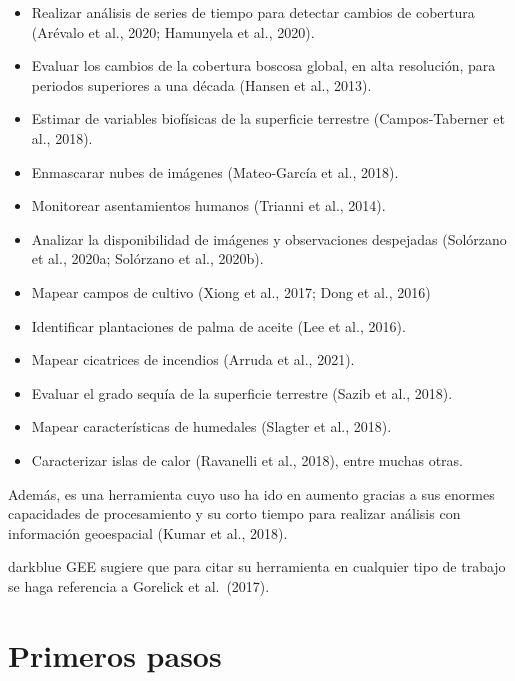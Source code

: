 \documentclass[
  12pt,
  letterpaper,
  twoside]{book}
\providecommand{\tightlist}{%
  \setlength{\itemsep}{0pt}\setlength{\parskip}{0pt}}
\begin{document}
\begin{itemize}
\tightlist
\item
  Realizar análisis de series de tiempo para detectar cambios de cobertura (Arévalo et al., 2020; Hamunyela et al., 2020).
\item
  Evaluar los cambios de la cobertura boscosa global, en alta resolución, para periodos superiores a una década (Hansen et al., 2013).
\item
  Estimar de variables biofísicas de la superficie terrestre (Campos-Taberner et al., 2018).
\item
  Enmascarar nubes de imágenes (Mateo-García et al., 2018).
\item
  Monitorear asentamientos humanos (Trianni et al., 2014).
\item
  Analizar la disponibilidad de imágenes y observaciones despejadas (Solórzano et al., 2020a; Solórzano et al., 2020b).
\item
  Mapear campos de cultivo (Xiong et al., 2017; Dong et al., 2016)
\item
  Identificar plantaciones de palma de aceite (Lee et al., 2016).
\item
  Mapear cicatrices de incendios (Arruda et al., 2021).
\item
  Evaluar el grado sequía de la superficie terrestre (Sazib et al., 2018).
\item
  Mapear características de humedales (Slagter et al., 2018).
\item
  Caracterizar islas de calor (Ravanelli et al., 2018), entre muchas otras.
\end{itemize}

Además, es una herramienta cuyo uso ha ido en aumento gracias a sus enormes capacidades de procesamiento y su corto tiempo para realizar análisis con información geoespacial (Kumar et al., 2018).

\begin{bluebox2}

\begin{awesomeblock}{5pt}{\faLightbulb}{darkblue}
GEE sugiere que para citar su herramienta en cualquier tipo de trabajo se haga referencia a Gorelick et al.~(2017).

\end{awesomeblock}

\end{bluebox2}

\newpage

\hypertarget{primeros-pasos}{%
\chapter{Primeros pasos}\label{primeros-pasos}}
\end{document}
